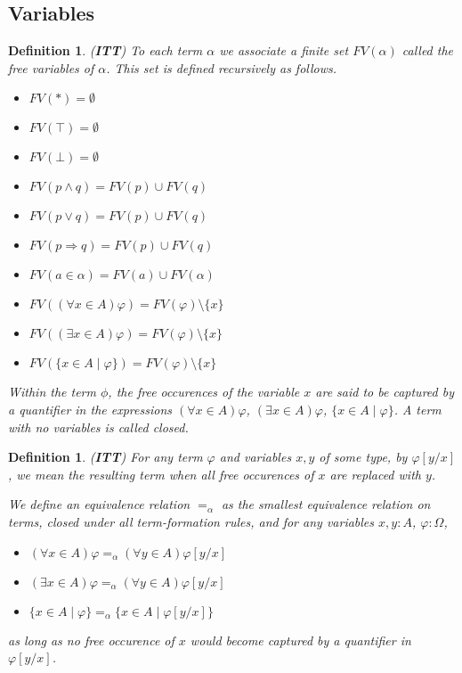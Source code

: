 \documentclass[12pt,leqno]{article}
\theoremstyle{example}
\newtheorem{definition}[theorem]{Definition}
\numberwithin{equation}{section}
\begin{document}
\subsection{Variables}\label{section:variables}
\begin{definition}(\textbf{ITT})
  To each term $\alpha$ we associate a finite set $FV(\alpha)$ called the \emph{free variables} of $\alpha$. This set is defined recursively as follows.
  \begin{multicols}{2}
    \begin{itemize}
      \item $FV(\ast) = \emptyset$
      \item $FV(\top) = \emptyset$
      \item $FV(\bot) = \emptyset$
      \item $FV(p \wedge q) = FV(p) \cup FV(q)$
      \item $FV(p \vee q) = FV(p) \cup FV(q)$
      \item $FV(p \Rightarrow q) = FV(p) \cup FV(q)$
      \item $FV(a \in \alpha) = FV(a) \cup FV(\alpha)$
      \item $FV((\forall x \in A)\varphi) = FV(\varphi) \setminus \{x\}$
      \item $FV((\exists x \in A)\varphi) = FV(\varphi) \setminus \{x\}$
      \item $FV(\{ x \in A \mid \varphi\}) = FV(\varphi) \setminus \{x\}$
    \end{itemize}
  \end{multicols}

  Within the term $\phi$, the free occurences of the variable $x$ are said to be \emph{captured} by a quantifier in the expressions $(\forall x \in A)\varphi$, $(\exists x \in A)\varphi$, $\{ x \in A \mid \varphi\}$. A term with no variables is called \emph{closed}.
\end{definition}

\begin{definition}(\textbf{ITT})
  For any term $\varphi$ and variables $x, y$ of some type, by $\varphi[y / x]$, we mean the resulting term when all free occurences of $x$ are replaced with $y$.

  We define an equivalence relation $=_\alpha$ as the smallest equivalence relation on terms, closed under all term-formation rules, and for any variables $x, y : A$, $\varphi : \Omega$,
  \begin{itemize}
    \item $(\forall x \in A)\varphi =_\alpha (\forall y \in A)\varphi[y / x]$
    \item $(\exists x \in A)\varphi =_\alpha (\forall y \in A)\varphi[y / x]$
    \item $\{ x \in A \mid \varphi\} =_\alpha \{ x \in A \mid \varphi[y / x]\}$
  \end{itemize}
  as long as no free occurence of $x$ would become captured by a quantifier in $\varphi[y / x]$.
\end{definition}
\end{document}
